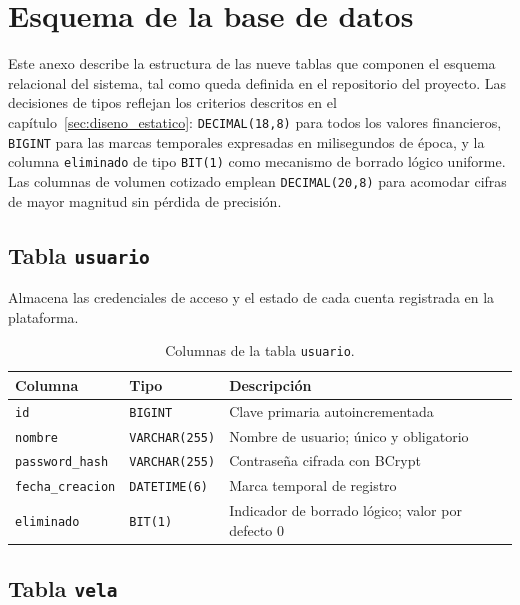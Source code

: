 \chapter{Esquema de la base de datos}
\label{anx:sql}

Este anexo describe la estructura de las nueve tablas que componen el esquema relacional del sistema, tal como queda definida en el repositorio del proyecto. Las decisiones de tipos reflejan los criterios descritos en el capítulo~\ref{sec:diseno_estatico}: \texttt{DECIMAL(18,8)} para todos los valores financieros, \texttt{BIGINT} para las marcas temporales expresadas en milisegundos de época, y la columna \texttt{eliminado} de tipo \texttt{BIT(1)} como mecanismo de borrado lógico uniforme. Las columnas de volumen cotizado emplean \texttt{DECIMAL(20,8)} para acomodar cifras de mayor magnitud sin pérdida de precisión.

\section*{Tabla \texttt{usuario}}

Almacena las credenciales de acceso y el estado de cada cuenta registrada en la plataforma.

\begin{table}[h]
\centering
\caption{Columnas de la tabla \texttt{usuario}.}
\label{tab:sql-usuario}
\begin{tabular}{@{}llp{7cm}@{}}
\toprule
\textbf{Columna} & \textbf{Tipo} & \textbf{Descripción} \\
\midrule
\texttt{id}             & \texttt{BIGINT}       & Clave primaria autoincrementada \\
\texttt{nombre}         & \texttt{VARCHAR(255)} & Nombre de usuario; único y obligatorio \\
\texttt{password\_hash} & \texttt{VARCHAR(255)} & Contraseña cifrada con BCrypt \\
\texttt{fecha\_creacion}& \texttt{DATETIME(6)}  & Marca temporal de registro \\
\texttt{eliminado}      & \texttt{BIT(1)}       & Indicador de borrado lógico; valor por defecto 0 \\
\bottomrule
\end{tabular}
\end{table}

\section*{Tabla \texttt{vela}}

